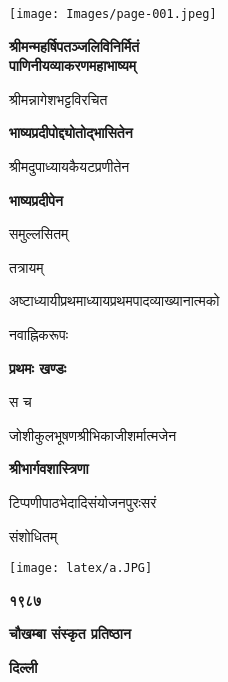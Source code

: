 \documentclass[11pt, openany]{book}
\begin{document}
\thispagestyle{empty}
\begin{center}
\texttt{[image: Images/page-001.jpeg]}
\end{center}


\newpage
\thispagestyle{empty}
\begin{center}
\textbf{\s \Large श्रीमन्महर्षिपतञ्जलिविनिर्मितं}\\
\textbf{\s \huge पाणिनीयव्याकरणमहाभाष्यम्}

\vspace{4mm}
{\s श्रीमन्नागेशभट्टविरचित \textendash\ \\}

\textbf{\s भाष्यप्रदीपोद्द्योतोद्भासितेन}

\vspace{2mm}
{\s श्रीमदुपाध्यायकैयटप्रणीतेन}

\textbf{\s भाष्यप्रदीपेन}

{\s समुल्लसितम्}

\vspace{3mm}
{\small \s तत्रायम्}

{\s अष्टाध्यायीप्रथमाध्यायप्रथमपादव्याख्यानात्मको}

{\s नवाह्निकरूपः}

\vspace{2mm}
\textbf{\s प्रथमः खण्डः}

\vspace{7mm}
{\s स च}

\vspace{3mm}
{\s जोशीकुलभूषणश्रीभिकाजीशर्मात्मजेन}

\textbf{\s श्रीभार्गवशास्त्रिणा}

\vspace{2mm}
{\s टिप्पणीपाठभेदादिसंयोजनपुरःसरं}

{\s संशोधितम्}

\vspace{10mm}
\texttt{[image: latex/a.JPG]}

\textbf{\large \s १९८७}

\textbf{\Large \s चौखम्बा संस्कृत प्रतिष्ठान}

\textbf{\s दिल्ली}
\end{center}
\end{document}

